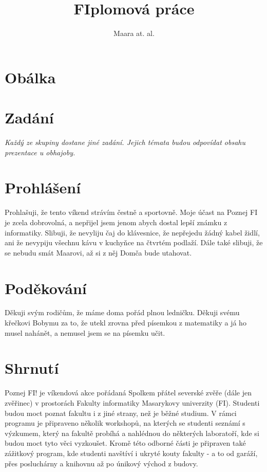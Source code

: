 \documentclass[]{article}
\title{FIplomová práce}
\author{Maara at. al.}
\begin{document}

\section{Obálka}

\section{Zadání}

\textit{Každý ze skupiny dostane jiné zadání. Jejich témata budou odpovídat obsahu prezentace u obhajoby.}

\section{Prohlášení}

Prohlašuji, že tento víkend strávím čestně a sportovně. Moje účast na Poznej FI je zcela dobrovolná, a nepřijel jsem jenom abych dostal lepší známku z informatiky. Slibuji, že nevyliju čaj do klávesnice, že nepřejedu žádný kabel židlí, ani že nevypiju všechnu kávu v kuchyňce na čtvrtém podlaží. Dále také slibuji, že se nebudu smát Maarovi, až si z něj Domča bude utahovat.

\section{Poděkování}

Děkuji svým rodičům, že máme doma pořád plnou ledničku. Děkuji svému křečkovi Bobymu za to, že utekl zrovna před písemkou z matematiky a já ho musel nahánět, a nemusel jsem se na písemku učit. 

\section{Shrnutí}

Poznej FI! je víkendová akce pořádaná Spolkem přátel severské zvěře (dále jen zvěřinec) v prostorách Fakulty informatiky Masarykovy univerzity (FI). Studenti budou moct poznat fakultu i z jiné strany, než je běžné studium. V rámci programu je připraveno několik workshopů, na kterých se studenti seznámí s výzkumem, který na fakultě probíhá a nahlédnou do některých laboratoří, kde si budou moct tyto věci vyzkoušet. Kromě této odborné části je připraven také zážitkový program, kde studenti navštíví i ukryté kouty fakulty - a to od garáží, přes posluchárny a knihovnu až po únikový východ z budovy.
\end{document}
